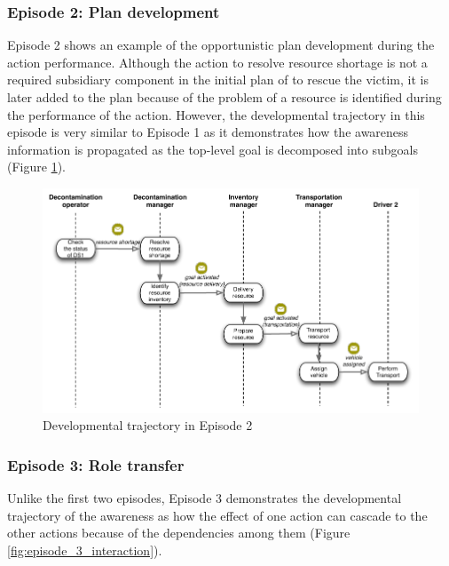 \subsubsection{Episode 2: Plan development} %
\label{ssub:episode_2_plan_development}
Episode 2 shows an example of the opportunistic plan development during the action performance. Although the action to resolve resource shortage is not a required subsidiary component in the initial plan of to rescue the victim, it is later added to the plan because of the problem of a resource is identified during the performance of the action. However, the developmental trajectory in this episode is very similar to Episode 1 as it demonstrates how the awareness information is propagated as the top-level goal is decomposed into subgoals (Figure \ref{fig:episode_2_interaction}).

\begin{figure}[htbp] %
   \centering
   \includegraphics{episode_2_interaction.pdf} 
   \caption{Developmental trajectory in Episode 2}
   \label{fig:episode_2_interaction}
\end{figure}

\subsubsection{Episode 3: Role transfer} %
\label{ssub:episode_3_responsibility_transfer}
Unlike the first two episodes, Episode 3 demonstrates the developmental trajectory of the awareness as how the effect of one action can cascade to the other actions because of the dependencies among them (Figure \ref{fig:episode_3_interaction}). 

